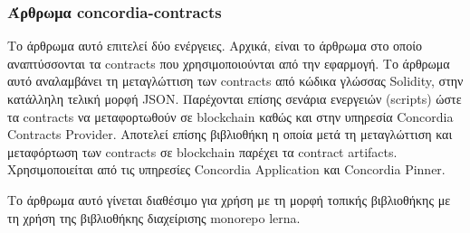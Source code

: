 \subsubsection{Άρθρωμα concordia-contracts} \label{subsubsection:4-3-1-concordia-contracts-unit}

Το άρθρωμα αυτό επιτελεί δύο ενέργειες. Αρχικά, είναι το άρθρωμα στο οποίο αναπτύσσονται τα contracts που χρησιμοποιούνται από την εφαρμογή. Το άρθρωμα αυτό αναλαμβάνει τη μεταγλώττιση των contracts από κώδικα γλώσσας Solidity, στην κατάλληλη τελική μορφή JSON. Παρέχονται επίσης σενάρια ενεργειών (scripts) ώστε τα contracts να μεταφορτωθούν σε blockchain καθώς και στην υπηρεσία Concordia Contracts Provider. Αποτελεί επίσης βιβλιοθήκη η οποία μετά τη μεταγλώττιση και μεταφόρτωση των contracts σε blockchain παρέχει τα contract artifacts. Χρησιμοποιείται από τις υπηρεσίες Concordia Application και Concordia Pinner.

Το άρθρωμα αυτό γίνεται διαθέσιμο για χρήση με τη μορφή τοπικής βιβλιοθήκης με τη χρήση της βιβλιοθήκης διαχείρισης monorepo lerna.